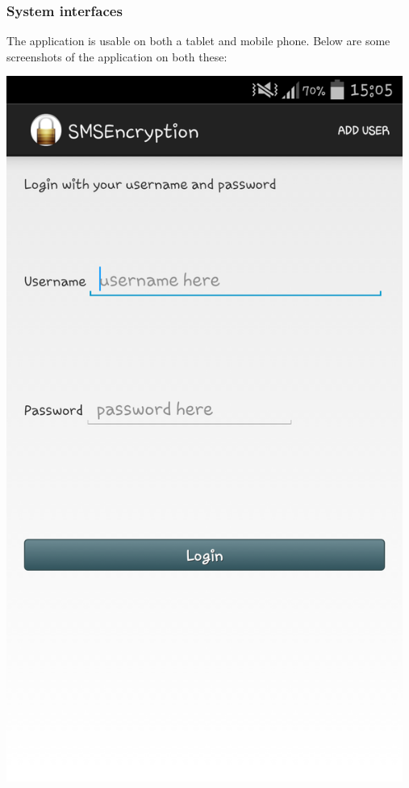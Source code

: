 \subsubsection{System interfaces}
The application is usable on both a tablet and mobile phone. Below are some screenshots of the application on both these:\\
\begin{center}
 \includegraphics[width=13cm]{screenshots/normal/1_LoginScreen.png}
\end{center}
